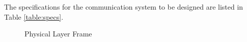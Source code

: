 The specifications for the communication system to be designed are listed in Table \ref{table:specs}.

\begin{figure}[!ht]
                \resizebox{\columnwidth}{!}{}
\caption{Physical Layer Frame}
\label{fig:ee18btech11041_frame}
\end{figure}
%
